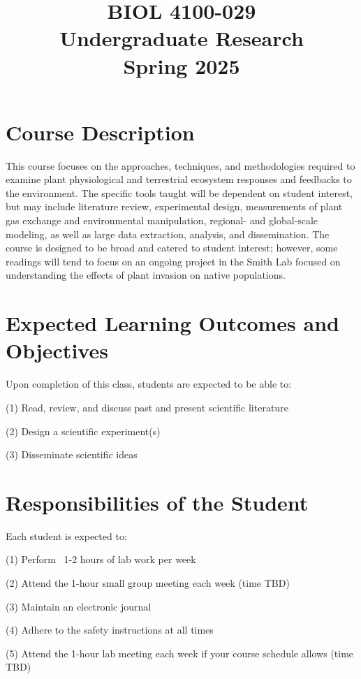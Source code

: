 \documentclass[12pt, notitlepage]{article}   	%
\title{
	\textbf{
		BIOL 4100-029
	} \\
	\large Undergraduate Research \\
	\large Spring 2025
}
\date{\vspace{-5ex}}
\begin{document}
{\selectfont %

\maketitle

\section{Course Description}
This course focuses on the approaches, techniques, and methodologies required to examine plant physiological and terrestrial ecosystem responses and feedbacks to the environment. The specific tools taught will be dependent on student interest, but may include literature review, experimental design, measurements of plant gas exchange and environmental manipulation, regional- and global-scale modeling, as well as large data extraction, analysis, and dissemination. The course is designed to be broad and catered to student interest; however, some readings will tend to focus on an ongoing project in the Smith Lab focused on understanding the effects of plant invasion on native populations.

\section{Expected Learning Outcomes and Objectives}
Upon completion of this class, students are expected to be able to:\par
(1)	Read, review, and discuss past and present scientific literature\par
(2) Design a scientific experiment(s)\par
(3) Disseminate scientific ideas\par

\section{Responsibilities of the Student}
Each student is expected to:\par
(1) Perform ~1-2 hours of lab work per week\par
(2) Attend the 1-hour small group meeting each week (time TBD)\par
(3) Maintain an electronic journal\par
(4) Adhere to the safety instructions at all times\par
(5) Attend the 1-hour lab meeting each week if your course schedule allows (time TBD)\par

}
\end{document}
